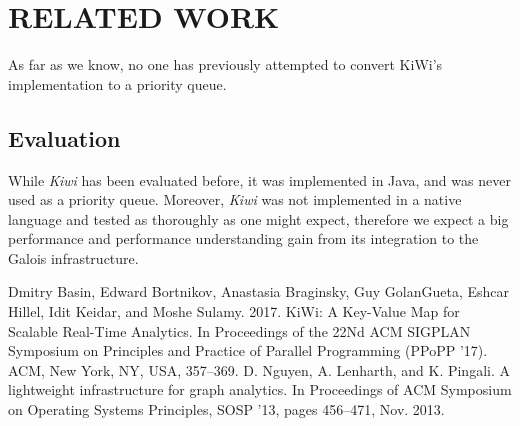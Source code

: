 \documentclass[letterpaper, 10 pt, conference]{ieeeconf}  %
\begin{document}
\section{RELATED WORK}
As far as we know, no one has previously attempted to convert KiWi's implementation to a priority queue.


\subsection{Evaluation}While \textit{Kiwi} has been evaluated before, it was implemented in Java, and was never used as a priority queue. 
Moreover, \textit{Kiwi} was not implemented in a native language and tested as thoroughly as one might expect, therefore we expect a big performance and performance understanding gain from its integration to the Galois infrastructure.





\begin{thebibliography}{99}

 Dmitry Basin, Edward Bortnikov, Anastasia Braginsky, Guy GolanGueta, Eshcar Hillel, Idit Keidar, and Moshe Sulamy. 2017. KiWi:
A Key-Value Map for Scalable Real-Time Analytics. In Proceedings
of the 22Nd ACM SIGPLAN Symposium on Principles and Practice of
Parallel Programming (PPoPP ’17). ACM, New York, NY, USA, 357–369.
 D. Nguyen, A. Lenharth, and K. Pingali. A lightweight infrastructure
for graph analytics. In Proceedings of ACM Symposium on Operating
Systems Principles, SOSP ’13, pages 456–471, Nov. 2013.







\end{thebibliography}
\end{document}
